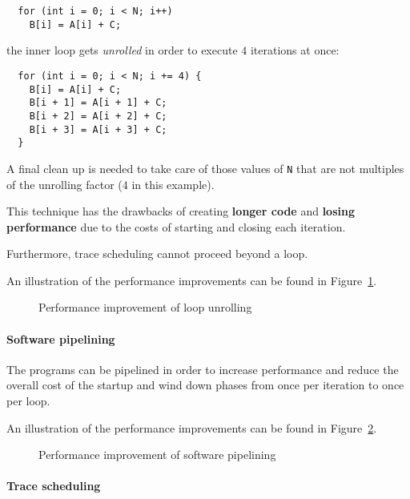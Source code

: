 \documentclass[english]{article}
\begin{document}
\begin{verbatim}
  for (int i = 0; i < N; i++)
    B[i] = A[i] + C;
\end{verbatim}

the inner loop gets \textit{unrolled} in order to execute \(4\) iterations at once:

\begin{verbatim}
  for (int i = 0; i < N; i += 4) {
    B[i] = A[i] + C;
    B[i + 1] = A[i + 1] + C;
    B[i + 2] = A[i + 2] + C;
    B[i + 3] = A[i + 3] + C;
  }
\end{verbatim}

A final clean up is needed to take care of those values of \texttt{N} that are not multiples of the unrolling factor (\(4\) in this example).

This technique has the drawbacks of creating \textbf{longer code} and \textbf{losing performance} due to the costs of starting and closing each iteration.

Furthermore, trace scheduling cannot proceed beyond a loop.

\bigskip
An illustration of the performance improvements can be found in Figure~\ref{fig:performance-improvement-loop-unrolling}.

\begin{figure}[htbp]
  \bigskip
  \centering
  \caption{Performance improvement of loop unrolling}
  \label{fig:performance-improvement-loop-unrolling}
  \bigskip
\end{figure}

\paragraph{Software pipelining}
\label{par:software-pipelining}

The programs can be pipelined in order to increase performance and reduce the overall cost of the startup and wind down phases from once per iteration to once per loop.

\bigskip
An illustration of the performance improvements can be found in Figure~\ref{fig:performance-improvement-software-pipelining}.

\begin{figure}[htbp]
  \bigskip
  \centering
  \caption{Performance improvement of software pipelining}
  \label{fig:performance-improvement-software-pipelining}
  \bigskip
\end{figure}

\paragraph{Trace scheduling}
\label{par:trace-scheduling}
\end{document}
